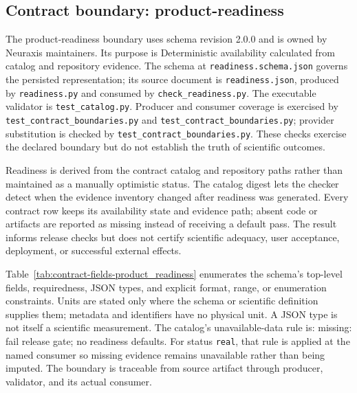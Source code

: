 \subsection{Contract boundary: product-readiness}\label{sec:contract-product_readiness}
The product-readiness boundary uses schema revision 2.0.0 and is owned by Neuraxis maintainers. Its purpose is Deterministic availability calculated from catalog and repository evidence. The schema at \texttt{readiness.schema.json} governs the persisted representation; its source document is \texttt{readiness.json}, produced by \texttt{readiness.py} and consumed by \texttt{check\_\allowbreak{}readiness.py}. The executable validator is \texttt{test\_\allowbreak{}catalog.py}. Producer and consumer coverage is exercised by \texttt{test\_\allowbreak{}contract\_\allowbreak{}boundaries.py} and \texttt{test\_\allowbreak{}contract\_\allowbreak{}boundaries.py}; provider substitution is checked by \texttt{test\_\allowbreak{}contract\_\allowbreak{}boundaries.py}. These checks exercise the declared boundary but do not establish the truth of scientific outcomes.

Readiness is derived from the contract catalog and repository paths rather than maintained as a manually optimistic status. The catalog digest lets the checker detect when the evidence inventory changed after readiness was generated. Every contract row keeps its availability state and evidence path; absent code or artifacts are reported as missing instead of receiving a default pass. The result informs release checks but does not certify scientific adequacy, user acceptance, deployment, or successful external effects.

Table~\ref{tab:contract-fields-product_readiness} enumerates the schema's top-level fields, requiredness, JSON types, and explicit format, range, or enumeration constraints. Units are stated only where the schema or scientific definition supplies them; metadata and identifiers have no physical unit. A JSON type is not itself a scientific measurement. The catalog's unavailable-data rule is: missing: fail release gate; no readiness defaults. For status \texttt{real}, that rule is applied at the named consumer so missing evidence remains unavailable rather than being imputed. The boundary is traceable from source artifact through producer, validator, and its actual consumer.

